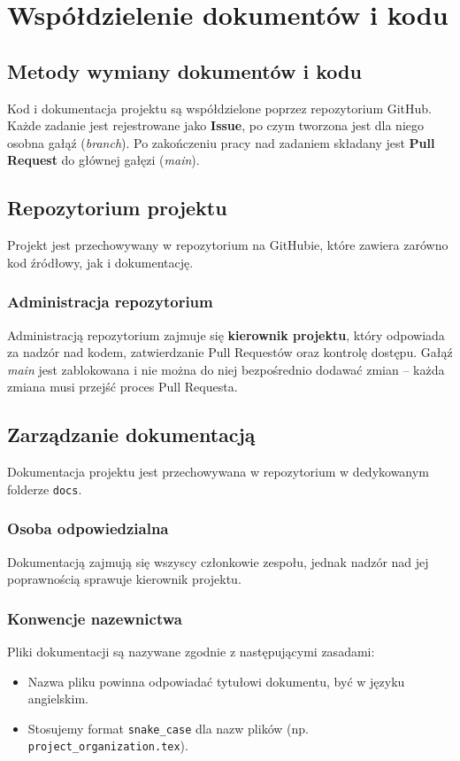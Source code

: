 \documentclass[12pt,a4paper]{book}
\begin{document}
\chapter{Współdzielenie dokumentów i kodu}
\section{Metody wymiany dokumentów i kodu}
Kod i dokumentacja projektu są współdzielone poprzez repozytorium GitHub. Każde zadanie jest rejestrowane jako \textbf{Issue}, po czym tworzona jest dla niego osobna gałąź (\textit{branch}). Po zakończeniu pracy nad zadaniem składany jest \textbf{Pull Request} do głównej gałęzi (\textit{main}).  
\section{Repozytorium projektu}
Projekt jest przechowywany w repozytorium na GitHubie, które zawiera zarówno kod źródłowy, jak i dokumentację.  

\subsection{Administracja repozytorium}
Administracją repozytorium zajmuje się \textbf{kierownik projektu}, który odpowiada za nadzór nad kodem, zatwierdzanie Pull Requestów oraz kontrolę dostępu. Gałąź \textit{main} jest zablokowana i nie można do niej bezpośrednio dodawać zmian – każda zmiana musi przejść proces Pull Requesta.  

\section{Zarządzanie dokumentacją}
Dokumentacja projektu jest przechowywana w repozytorium w dedykowanym folderze \texttt{docs}.  

\subsection{Osoba odpowiedzialna}
Dokumentacją zajmują się wszyscy członkowie zespołu, jednak nadzór nad jej poprawnością sprawuje kierownik projektu.  

\subsection{Konwencje nazewnictwa}  
Pliki dokumentacji są nazywane zgodnie z następującymi zasadami:  
\begin{itemize}  
    \item Nazwa pliku powinna odpowiadać tytułowi dokumentu, być w języku angielskim.  
    \item Stosujemy format \texttt{snake\_case} dla nazw plików 
    (np. \texttt{project\_organization.tex}).  
\end{itemize}  
\end{document}
